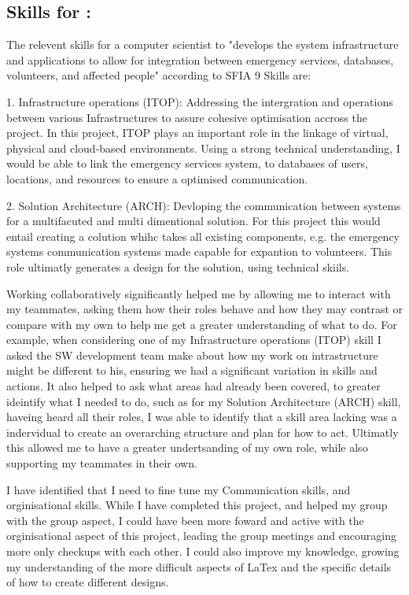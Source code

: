 \documentclass[a4paper, 11pt]{report}
\begin{document}
\subsection{Skills for \majA: \studA}

The relevent skills for a computer scientist to "develops the system infrastructure and applications to allow for integration between emergency services, databases, volunteers, and affected people" according to SFIA 9 Skills are:

1. Infrastructure operations (ITOP): Addressing the intergration and operations between various Infrastructures to assure cohesive optimisation accross the project. In this project, ITOP plays an important role in the linkage of virtual, physical and cloud-based environments. Using a strong technical understanding, I  would be able to link the emergency services system, to databases of users, locations, and resources to ensure a optimised communication. 

2. Solution Architecture (ARCH): Devloping the communication between systems for a multifacuted and multi dimentional solution. For this project this would entail creating a colution whihc takes all existing components, e.g. the emergency systems communication systems made capable for expantion to volunteers. This role ultimatly generates a design for the solution, using technical skiils. 

Working collaboratively significantly helped me by allowing me to interact with my teammates, asking them how their roles behave and how they may contrast or compare with my own to help me get a greater understanding of what to do. For example, when considering one of my Infrastructure operations (ITOP) skill I asked the SW development team make about how my work on intrastructure might be different to his, ensuring we had a significant variation in skills and actions. It also helped to ask what areas had already been covered, to greater ideintify what I needed to do, such as for my Solution Architecture (ARCH) skill, haveing heard all their roles, I was able to identify that a skill area lacking was a indervidual to create an overarching structure and plan for how to act. Ultimatly this allowed me to have a greater undertsanding of my own role, while also  supporting my teammates in their own. 

I have identified that I need to fine tune my Communication skills, and orginisational skills. While I have completed this project, and helped my group with the group aspect, I could have been more foward and active with the orginisational aspect of this project, leading the group meetings and encouraging more only checkups with each other. I could also improve my knowledge, growing my understanding of the more difficult aspects of LaTex and the specific details of how to create different designs. 
\end{document}
